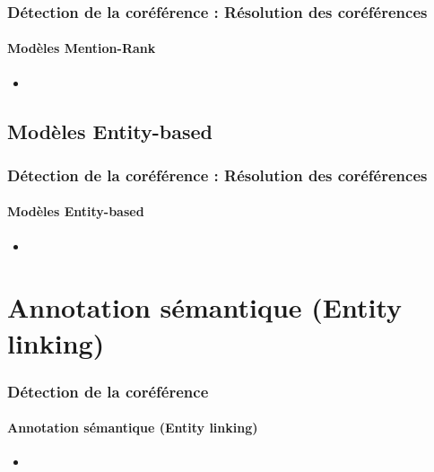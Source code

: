 \documentclass[xcolor=table]{beamer}
\begin{document}
\begin{frame}
	\frametitle{Détection de la coréférence : Résolution des coréférences}
	\framesubtitle{Modèles Mention-Rank}
	
	\begin{itemize}
		\item 
	\end{itemize}
	
\end{frame}

\subsection{Modèles Entity-based}

\begin{frame}
	\frametitle{Détection de la coréférence : Résolution des coréférences}
	\framesubtitle{Modèles Entity-based}
	
	\begin{itemize}
		\item 
	\end{itemize}
	
\end{frame}

\section{Annotation sémantique (Entity linking)}

\begin{frame}
	\frametitle{Détection de la coréférence}
	\framesubtitle{Annotation sémantique (Entity linking)}
	
	\begin{itemize}
		\item 
	\end{itemize}
	
\end{frame}


\end{document}

